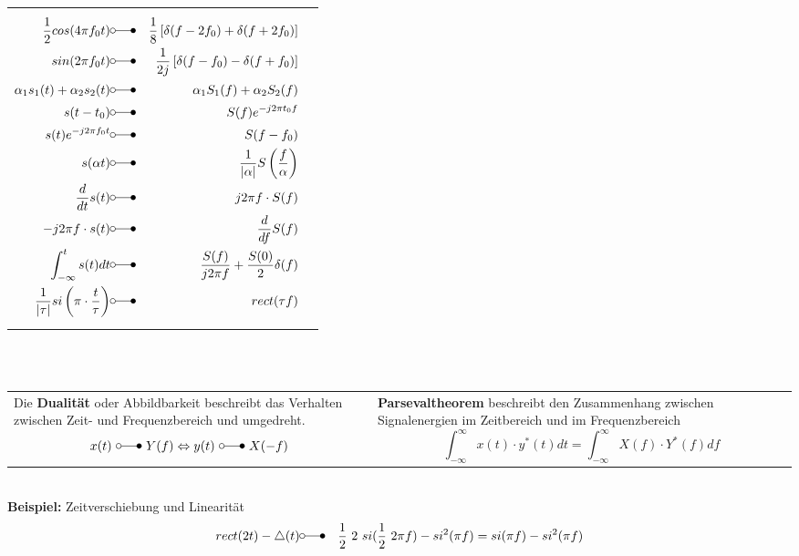 \begin{tabular}{ll}
{\begin{eqnarray*}
\frac{1}{2} cos(4 \pi f_0 t) &\laplace& \frac{1}{8}\left[ \delta(f-2f_0) + \delta(f+2f_0)\right] \\
sin(2 \pi f_0 t) &\laplace& \frac{1}{2j}\left[ \delta(f-f_0) - \delta(f+f_0)\right] \\
\alpha_1 s_1(t) + \alpha_2 s_2(t) &\laplace& \alpha_1 S_1(f) + \alpha_2 S_2(f)\\
s(t-t_0) &\laplace& S(f) e^{-j2 \pi t_0 f}\\
s(t) e^{-j2 \pi f_0 t} &\laplace& S(f-f_0)\\
s(\alpha t) &\laplace& \frac{1}{\vert \alpha \vert} S\left( \frac{f}{\alpha}\right)\\
\frac{d}{dt}s(t) &\laplace& j2 \pi f \cdot S(f)\\
-j2 \pi f \cdot s(t) &\laplace&  \frac{d}{df} S(f)\\
\int^t_{-\infty} s(t) dt &\laplace& \frac{S(f)}{j2 \pi f} + \frac{S(0)}{2}\delta(f)\\
\frac{1}{\vert \tau \vert} si\left( \pi \cdot \frac{t}{\tau} \right) &\laplace&  rect(\tau f)
 \end{eqnarray*}}
\end{tabular}\\~
\begin{tabular}{ll}
 \addtolength{\jot}{2mm}
 \parbox{7cm}{
 Die \textbf{Dualität} oder Abbildbarkeit beschreibt das Verhalten zwischen Zeit- und Frequenzbereich und umgedreht. 
\begin{equation*}
x(t) ~\laplace~ Y(f) \Leftrightarrow y(t)~ \laplace~ X(-f)
\end{equation*}
}&
 \parbox{5cm}{
\textbf{Parsevaltheorem} beschreibt den Zusammenhang zwischen Signalenergien im Zeitbereich und im Frequenzbereich
 \begin{equation*}
\int^\infty_{-\infty} x(t) \cdot y^*(t) dt = \int^\infty_{-\infty} X(f) \cdot Y^*(f) df 
\end{equation*}
}
\end{tabular}\\
\textbf{Beispiel:} \quad Zeitverschiebung und Linearität 
\begin{eqnarray*} 
rect(2t) - \triangle(t) &\laplace& \frac{1}{2} ~2 ~si(\frac{1}{2}~2 \pi f) - si^2(\pi f) = si(\pi f) - si^2(\pi f)
\end{eqnarray*}

